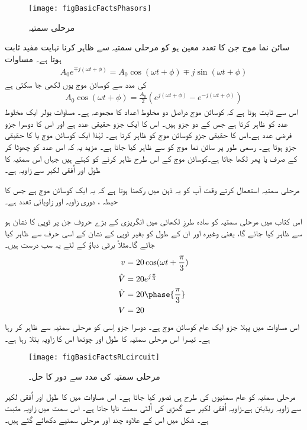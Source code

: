 \begin{figure}
\centering
\texttt{[image: figBasicFactsPhasors]}
\caption{مرحلی سمتیہ}
\label{شکل_حقائق_دوری_سمتیات}
\end{figure}
سائن نما موج جن کا تعدد معین ہو کو مرحلی سمتیہ سے ظاہر کرنا نہایت مفید ثابت ہوتا ہے۔ مساوات 
\begin{align}
A_0 e^{\mp j (\omega t + \phi)}=A_0 \cos (\omega t +\phi) \mp j \sin (\omega t+\phi)
\end{align}
کی مدد سے کوسائن موج یوں لکھی جا سکتی ہے
\begin{align}
A_0 \cos (\omega t +\phi)=\frac{A_0}{2} \left(e^{j(\omega t +\phi)} -e^{-j(\omega t +\phi)}\right)
\end{align}
اس سے ثابت ہوتا ہے کہ کوسائن موج دراصل دو مخلوط اعداد کا مجموعہ ہے۔ مساوات یولر ایک مخلوط عدد کو ظاہر کرتا ہے جس کے دو جزو ہیں۔ اس کا ایک جزو حقیقی عدد ہے اور اس کا دوسرا جزو فرضی عدد ہے۔اس کا حقیقی جزو کوسائن موج کو ظاہر کرتا ہے۔ لہٰذا ایک کوسائن موج   یا  کا حقیقی جزو ہوتا ہے۔ رسمی طور پر سائن نما موج کو  سے ظاہر کیا جاتا ہے۔ مزید یہ کہ اس عدد کو چھوٹا کر کے صرف  یا پھر  لکھا جاتا ہے۔کوسائن موج کے اس طرح ظاہر کرنے کو  کہتے ہیں جہاں اس سمتیہ کا طول  اور اُفقی لکیر سے زاویہ  ہے۔

	 مرحلی سمتیہ استعمال کرتے وقت آپ کو یہ ذہن میں رکھنا ہوتا ہے کہ یہ ایک کوسائن موج ہے جس کا حیطہ   ، دوری زاویہ  اور زاویائی تعدد  ہے۔

اس کتاب میں مرحلی سمتیہ کو سادہ طرزِ لکھائی میں انگریزی کے بڑے حروف جن پر ٹوپی کا نشان ہو سے ظاہر کیا جائے گا، یعنی   وغیرہ اور ان کے طول کو بغیر ٹوپی کے نشان کے اسی حرف سے ظاہر کیا جائے گا۔مثلاً برقی دباؤ  کے لئے یہ سب درست ہیں۔
\begin{gather}
\begin{aligned}
v&=20 \cos (\omega t +\frac{\pi}{3})\\
\hat{V}&=20 e^{j \frac{\pi}{3}}\\
\hat{V}&=20 \phase{\frac{\pi}{3}}\\
V&=20
\end{aligned}
\end{gather}
اس مساوات میں پہلا جزو ایک عام کوسائن موج ہے۔ دوسرا جزو اِسی کو مرحلی سمتیہ سے ظاہر کر رہا ہے۔ تیسرا اس مرحلی سمتیہ کا طول اور چوتھا اس کا زاویہ بتلا رہا ہے۔
\begin{figure}
\centering
\texttt{[image: figBasicFactsRLcircuit]}
\caption{مرحلی سمتیہ کی مدد سے  دور کا حل۔}
\label{شکل_حقائق_دوری_سمتیہ_سے_دور_حل}
\end{figure}
	مرحلی سمتیہ کو عام سمتیوں کی طرح ہی تصور کیا جاتا ہے۔ اس مساوات میں  کا طول  اور اُفقی لکیر سے زاویہ   ریڈیئن ہے۔زاویہ اُفقی لکیر سے گھڑی کی اُلٹی سمت ناپا جاتا ہے۔ اس سمت میں زاویہ مثبت ہے۔ شکل  میں اس  کے علاوہ چند اور مرحلی سمتیے دکھائے گئے ہیں۔

